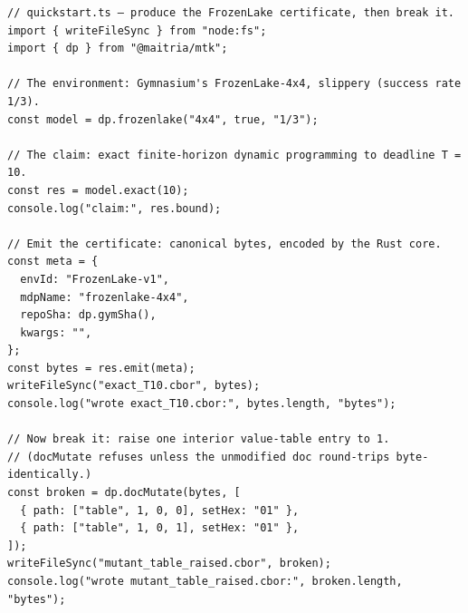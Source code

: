 \begin{Verbatim}[fontsize=\small,frame=leftline,rulecolor=\color{accentmid},framesep=3mm,xleftmargin=3mm]
// quickstart.ts — produce the FrozenLake certificate, then break it.
import { writeFileSync } from "node:fs";
import { dp } from "@maitria/mtk";

// The environment: Gymnasium's FrozenLake-4x4, slippery (success rate 1/3).
const model = dp.frozenlake("4x4", true, "1/3");

// The claim: exact finite-horizon dynamic programming to deadline T = 10.
const res = model.exact(10);
console.log("claim:", res.bound);

// Emit the certificate: canonical bytes, encoded by the Rust core.
const meta = {
  envId: "FrozenLake-v1",
  mdpName: "frozenlake-4x4",
  repoSha: dp.gymSha(),
  kwargs: "",
};
const bytes = res.emit(meta);
writeFileSync("exact_T10.cbor", bytes);
console.log("wrote exact_T10.cbor:", bytes.length, "bytes");

// Now break it: raise one interior value-table entry to 1.
// (docMutate refuses unless the unmodified doc round-trips byte-identically.)
const broken = dp.docMutate(bytes, [
  { path: ["table", 1, 0, 0], setHex: "01" },
  { path: ["table", 1, 0, 1], setHex: "01" },
]);
writeFileSync("mutant_table_raised.cbor", broken);
console.log("wrote mutant_table_raised.cbor:", broken.length, "bytes");
\end{Verbatim}
